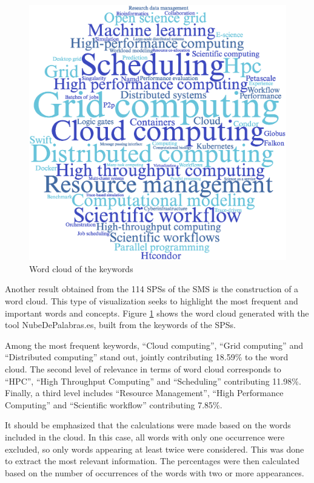 \begin{figure}[ht]
	\centering
	\includegraphics[scale=0.3]{resources/figures/wordcloud.eps}
	\caption{Word cloud of the keywords}
	\label{fig:WordCloud}
\end{figure}

Another result obtained from the 114 SPSs of the SMS is the construction of a word cloud. This type of visualization seeks to highlight the most frequent and important words and concepts. Figure \ref{fig:WordCloud} shows the word cloud generated with the tool NubeDePalabras.es, built from the keywords of the SPSs.

Among the most frequent keywords, ``Cloud computing'', ``Grid computing'' and ``Distributed computing'' stand out, jointly contributing 18.59\% to the word cloud. The second level of relevance in terms of word cloud corresponds to ``HPC'', ``High Throughput Computing'' and ``Scheduling'' contributing 11.98\%. Finally, a third level includes ``Resource Management'', ``High Performance Computing'' and ``Scientific workflow'' contributing 7.85\%.

It should be emphasized that the calculations were made based on the words included in the cloud. In this case, all words with only one occurrence were excluded, so only words appearing at least twice were considered. This was done to extract the most relevant information. The percentages were then calculated based on the number of occurrences of the words with two or more appearances.